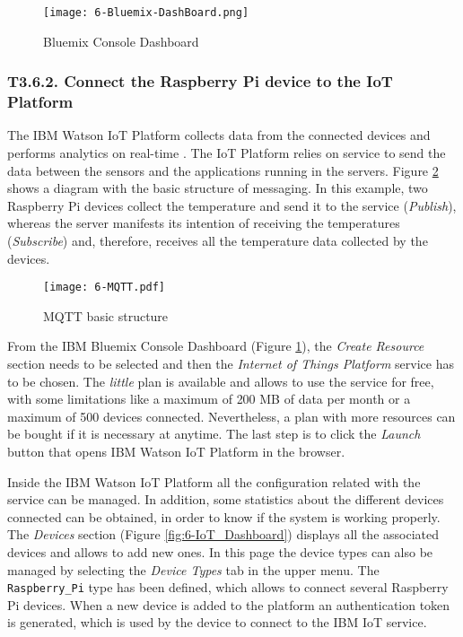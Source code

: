 \begin{figure}[!h]
	\begin{center}
		\texttt{[image: 6-Bluemix-DashBoard.png]}
		\caption{Bluemix Console Dashboard}
		\label{fig:6-Bluemix-DashBoard}
	\end{center}
\end{figure}


\subsubsection{T3.6.2. Connect the Raspberry Pi device to the IoT Platform}

The IBM Watson \ac{IoT} Platform collects data from the connected devices and performs analytics on real-time \cite{IBMIoT}. The \ac{IoT} Platform relies on  service to send the data between the sensors and the applications running in the servers. Figure \ref{fig:6-MQTT} shows a diagram with the basic structure of  messaging. In this example, two Raspberry Pi devices collect the temperature and send it to the  service (\emph{Publish}), whereas the server manifests its intention of receiving the temperatures (\emph{Subscribe}) and, therefore, receives all the temperature data collected by the devices.

\begin{figure}[!h]
	\begin{center}
		\texttt{[image: 6-MQTT.pdf]}
		\caption{MQTT basic structure}
		\label{fig:6-MQTT}
	\end{center}
\end{figure}

From the IBM Bluemix Console Dashboard (Figure \ref{fig:6-Bluemix-DashBoard}), the \emph{Create Resource} section needs to be selected and then the \emph{Internet of Things Platform} service has to be chosen. The \emph{little} plan is available and allows to use the service for free, with some limitations like a maximum of 200 MB of data per month or a maximum of 500 devices connected. Nevertheless, a plan with more resources can be bought if it is necessary at anytime. The last step is to click the \textit{Launch} button that opens IBM Watson \ac{IoT} Platform in the browser.

Inside the IBM Watson \ac{IoT} Platform all the configuration related with the service can be managed. In addition, some statistics about the different devices connected can be obtained, in order to know if the system is working properly. The \textit{Devices} section (Figure \ref{fig:6-IoT_Dashboard}) displays all the associated devices and allows to add new ones. In this page the device types can also be managed by selecting the \textit{Device Types} tab in the upper menu. The \texttt{Raspberry\_Pi} type has been defined, which allows to connect several Raspberry Pi devices. When a new device is added to the platform an authentication token is generated, which is used by the device to connect to the IBM \ac{IoT} service. 

